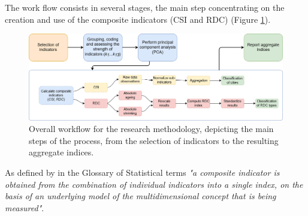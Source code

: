 The work flow consists in several stages, the main step concentrating on the creation and use of the composite indicators (CSI and RDC) (Figure \ref{figure:workflow}).

\begin{figure}[!htbp]
	\centering
	\includegraphics[width=1\textwidth]{workflow}
	\caption{Overall workflow for the research methodology, depicting the main steps of the process, from the selection of indicators to the resulting aggregate indices.}
	\label{figure:workflow}
\end{figure}

As defined by \citet{oecd_handbook_2008} in the Glossary of Statistical terms \textit{"a composite indicator is obtained from the combination of individual indicators into a single index, on the basis of an underlying model of the multidimensional concept that is being measured"}.

